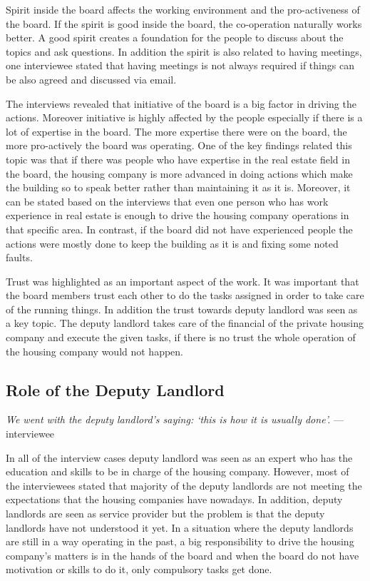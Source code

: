 Spirit inside the board affects the working environment and the pro-activeness of the board. If the spirit is good inside the board, the co-operation naturally works better. A good spirit creates a foundation for the people to discuss about the topics and ask questions. In addition the spirit is also related to having meetings, one interviewee stated that having meetings is not always required if things can be also agreed and discussed via email.

The interviews revealed that initiative of the board is a big factor in driving the actions. Moreover initiative is highly affected by the people especially if there is a lot of expertise in the board. The more expertise there were on the board, the more pro-actively the board was operating.  One of the key findings related this topic was that if there was people who have expertise in the real estate field in the board, the housing company is more advanced in doing actions which make the building so to speak better rather than maintaining it as it is. Moreover, it can be stated based on the interviews that even one person who has work experience in real estate is enough to drive the housing company operations in that specific area. In contrast, if the board did not have experienced people the actions were mostly done to keep the building as it is and fixing some noted faults.

Trust was highlighted as an important aspect of the work. It was important that the board members trust each other to do the tasks assigned in order to take care of the running things. In addition the trust towards deputy landlord was seen as a key topic. The deputy landlord takes care of the financial of the private housing company and execute the given tasks, if there is no trust the whole operation of the housing company would not happen.

\subsection{Role of the Deputy Landlord}

\begin{displayquote}
\textit{We went with the deputy landlord's saying: ‘this is how it is usually done’.} --- interviewee
\end{displayquote}

In all of the interview cases deputy landlord was seen as an expert who has the education and skills to be in charge of the housing company. However, most of the interviewees stated that majority of the deputy landlords are not meeting the expectations that the housing companies have nowadays. In addition, deputy landlords are seen as service provider but the problem is that the deputy landlords have not understood it yet. In a situation where the deputy landlords are still in a way operating in the past, a big responsibility to drive the housing company's matters is in the hands of the board and when the board do not have motivation or skills to do it, only compulsory tasks get done.

